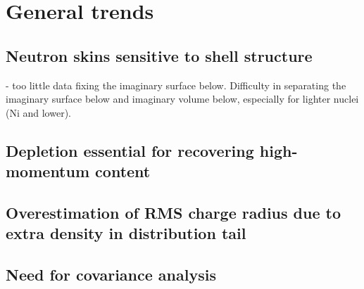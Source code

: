 
\section{General trends}
\subsection{Neutron skins sensitive to shell structure}
- too little data fixing the imaginary surface below. Difficulty in separating the imaginary surface
below and imaginary volume below, especially for lighter nuclei (Ni and lower).
\subsection{Depletion essential for recovering high-momentum content}
\subsection{Overestimation of RMS charge radius due to extra density in distribution tail}
\subsection{Need for covariance analysis}

\afterpage{\clearpage}

